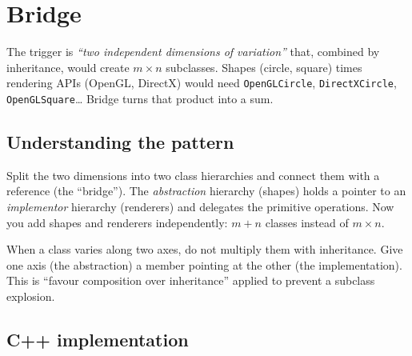 \section{Bridge}
\label{sec:pat-bridge}


\begin{patternbox}
The trigger is \emph{``two independent dimensions of variation''} that,
combined by inheritance, would create $m\times n$ subclasses. Shapes
(circle, square) times rendering APIs (OpenGL, DirectX) would need
\texttt{OpenGLCircle}, \texttt{DirectXCircle}, \texttt{OpenGLSquare}\ldots
Bridge turns that product into a sum.
\end{patternbox}

\subsection*{Understanding the pattern}

Split the two dimensions into two class hierarchies and connect them with
a reference (the ``bridge''). The \emph{abstraction} hierarchy (shapes)
holds a pointer to an \emph{implementor} hierarchy (renderers) and
delegates the primitive operations. Now you add shapes and renderers
independently: $m+n$ classes instead of $m\times n$.

\begin{ideabox}
When a class varies along two axes, do not multiply them with inheritance.
Give one axis (the abstraction) a member pointing at the other (the
implementation). This is ``favour composition over inheritance'' applied
to prevent a subclass explosion.
\end{ideabox}

\subsection*{C++ implementation}

